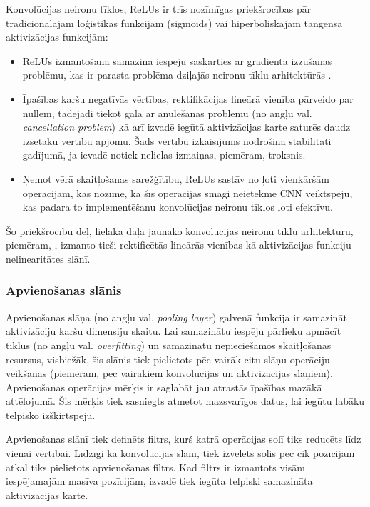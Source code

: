 Konvolūcijas neironu tīklos, ReLUs ir trīs nozīmīgas priekšrocības pār tradicionālajām loģistikas funkcijām (sigmoīds) vai hiperboliskajām tangensa aktivizācijas funkcijām:
\begin{itemize}
	\item ReLUs izmantošana samazina iespēju saskarties ar gradienta izzušanas problēmu, kas ir parasta problēma dziļajās neironu tīklu arhitektūrās \cite{hochreiter1998vanishing}.
	\item Īpašības karšu negatīvās vērtības, rektifikācijas lineārā vienība pārveido par nullēm, tādējādi tiekot galā ar anulēšanas problēmu (no angļu val. \textit{cancellation problem}) kā arī izvadē iegūtā aktivizācijas karte saturēs daudz izsētāku vērtību apjomu. Šāds vērtību izkaisījums nodrošina stabilitāti gadījumā, ja ievadē notiek nelielas izmaiņas, piemēram, troksnis\cite{glorot2011deep}. 
	\item Ņemot vērā skaitļošanas sarežģītību, ReLUs sastāv no ļoti vienkāršām operācijām, kas nozīmē, ka šīs operācijas smagi neietekmē CNN veiktspēju, kas padara to implementēšanu konvolūcijas neironu tīklos ļoti efektīvu.
\end{itemize}
Šo priekšrocību dēļ, lielākā daļa jaunāko konvolūcijas neironu tīklu arhitektūru, piemēram, \cite{krizhevsky2012imagenet}\cite{DBLP:journals/corr/HeZR015}\cite{simonyan2014very}, izmanto tieši rektificētās lineārās vienības kā aktivizācijas funkciju nelinearitātes slānī.
\subsubsection{Apvienošanas slānis}
Apvienošanas slāņa (no angļu val. \textit{pooling layer}) galvenā funkcija ir samazināt aktivizāciju karšu dimensiju skaitu. Lai samazinātu iespēju pārlieku apmācīt tīklus (no angļu val. \textit{overfitting}) un samazinātu nepieciešamos skaitļošanas resursus, visbiežāk, šis slānis tiek pielietots pēc vairāk citu slāņu operāciju veikšanas (piemēram, pēc vairākiem konvolūcijas un aktivizācijas slāņiem). Apvienošanas operācijas mērķis ir saglabāt jau atrastās īpašības mazākā attēlojumā. Šis mērķis tiek sasniegts atmetot mazsvarīgos datus, lai iegūtu labāku telpisko izšķirtspēju. 

Apvienošanas slānī tiek definēts filtrs, kurš katrā operācijas solī tiks reducēts līdz vienai vērtībai. Līdzīgi kā konvolūcijas slānī, tiek izvēlēts solis pēc cik pozīcijām atkal tiks pielietots apvienošanas filtrs. Kad filtrs ir izmantots visām iespējamajām masīva pozīcijām, izvadē tiek iegūta telpiski samazināta aktivizācijas karte.

